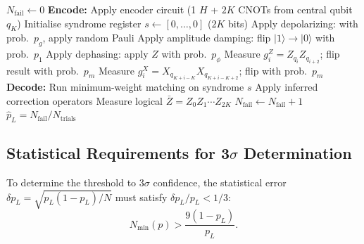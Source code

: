 \documentclass[11pt]{article}
\theoremstyle{definition}
\theoremstyle{remark}
\begin{document}
\begin{algorithm}[H]
\caption{Circuit-Level Monte Carlo for Psi-QEC $[[2K+1,1,K+1]]$}
\label{alg:monte-carlo}
\begin{algorithmic}[1]
\State $N_{\mathrm{fail}} \leftarrow 0$
  \State \textbf{Encode:} Apply encoder circuit (1 $H$ + $2K$ CNOTs from central qubit $q_K$)
  \State Initialise syndrome register $s \leftarrow [0, \ldots, 0]$ ($2K$ bits)
      \State Apply depolarizing: with prob.\ $p_g$, apply random Pauli
      \State Apply amplitude damping: flip $|1\rangle \to |0\rangle$ with prob.\ $p_1$
      \State Apply dephasing: apply $Z$ with prob.\ $p_\phi$
    \EndFor
     
      \State Measure $g_i^Z = Z_{q_i} Z_{q_{i+2}}$; flip result with prob.\ $p_m$
    \EndFor
     
      \State Measure $g_i^X = X_{q_{K+i-K}} X_{q_{K+i-K+2}}$; flip with prob.\ $p_m$
    \EndFor
    \State \textbf{Decode:} Run minimum-weight matching on syndrome $s$
    \State Apply inferred correction operators
  \EndFor
  \State Measure logical $\bar{Z} = Z_0 Z_1 \cdots Z_{2K}$
    \State $N_{\mathrm{fail}} \leftarrow N_{\mathrm{fail}} + 1$
  \EndIf
\EndFor
\State \Return $\hat{p}_L = N_{\mathrm{fail}} / N_{\mathrm{trials}}$
\end{algorithmic}
\end{algorithm}

\subsection{Statistical Requirements for 3$\sigma$ Determination}
\label{sec:statistics}

To determine the threshold to $3\sigma$ confidence, the statistical error
$\delta p_L = \sqrt{p_L(1-p_L)/N}$ must satisfy $\delta p_L / p_L < 1/3$:
\begin{equation}
  N_{\min}(p) > \frac{9(1-p_L)}{p_L}.
  \label{eq:N-requirement}
\end{equation}
\end{document}
